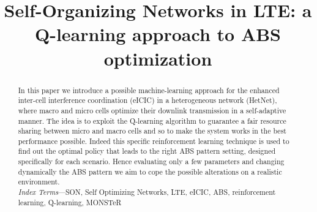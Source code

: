 \documentclass[conference,10pt]{IEEEtran}
\begin{document}
\title{Self-Organizing Networks	in LTE: a Q-learning approach to ABS optimization}

\author{
}

\maketitle
\thispagestyle{plain}
\pagestyle{plain}
\begin{abstract}
In this paper we introduce a possible machine-learning approach for the enhanced inter-cell interference coordination (eICIC) in a heterogeneous network (HetNet), where macro and micro cells optimize their downlink transmission in a self-adaptive manner. The idea is to exploit the Q-learning algorithm to guarantee a fair resource sharing between micro and macro cells and so to make the system works in the best performance possible. Indeed this specific reinforcement learning technique is used to find out the optimal policy that leads to the right ABS pattern setting, designed specifically for each scenario. Hence evaluating only a few parameters and changing dynamically the ABS pattern we aim to cope the possible alterations on a realistic environment.\\

\textit{Index  Terms}---SON, Self Optimizing Networks, LTE, eICIC, ABS, reinforcement learning, Q-learning, MONSTeR     
\end{abstract}

\end{document}

